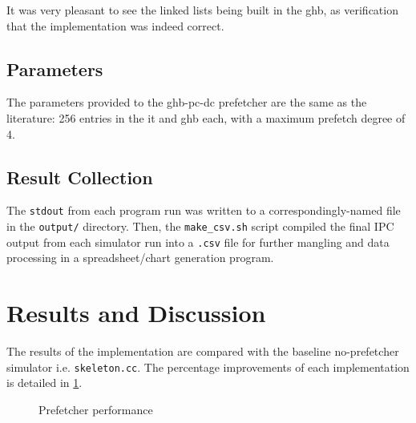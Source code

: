 \documentclass[multicol,date,tikzlibs,minted,ieeebib,bibtex]{epreport}
\begin{document}
\begin{multicols}{2}
	It was very pleasant to see the linked lists being built in the \gls{ghb}, as verification that the implementation was indeed correct.

	\subsection{Parameters}
	The parameters provided to the \gls{ghb-pc-dc} prefetcher are the same as the literature: 256 entries in the \gls{it} and \gls{ghb} each, with a maximum prefetch degree of 4.

	\subsection{Result Collection}
	The \texttt{stdout} from each program run was written to a correspondingly-named file in the \texttt{output/} directory.
	Then, the \texttt{make\_csv.sh} script compiled the final IPC output from each simulator run into a \texttt{.csv} file for further mangling and data processing in a spreadsheet/chart generation program.

	\section{Results and Discussion}
	The results of the implementation are compared with the baseline no-prefetcher simulator i.e. \texttt{skeleton.cc}.
	The percentage improvements of each implementation is detailed in \cref{fig:prefetcher-perf}.
\end{multicols}
\begin{figure}[htbp]
	\centering
	
	\caption{Prefetcher performance}\label{fig:prefetcher-perf}
\end{figure}
\end{document}
